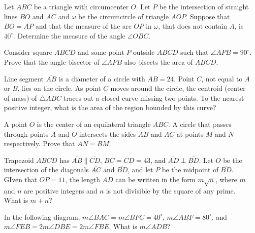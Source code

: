 \documentclass[blue,onecol]{shooting}
\begin{document}
\begin{req}[Brazil 2007]{4}
Let $ABC$ be a triangle with circumcenter $O$. Let $P$ be the intersection of straight lines $BO$ and $AC$ and $\omega$ be the circumcircle of triangle $AOP$. Suppose that $BO = AP$ and that the measure of the arc $OP$ in $\omega$, that does not contain $A$, is $40^{\circ}$. Determine the measure of the angle $\angle OBC$.
\end{req}

\begin{prob}[]{4}
Consider square $ABCD$ and some point $P$ outside $ABCD$ such that $\angle APB=90^{\circ}.$ Prove that the angle bisector of $\angle APB$ also bisects the area of $ABCD.$
\end{prob}
 
\begin{req}[AMC 10B 2018/12]{4}
Line segment $\overline{AB}$ is a diameter of a circle with $AB=24$. Point $C$, not equal to $A$ or $B$, lies on the circle. As point $C$ moves around the circle, the centroid (center of mass) of $\triangle{ABC}$ traces out a closed curve missing two points. To the nearest positive integer, what is the area of the region bounded by this curve?
\end{req}

\begin{prob}{6}
A point $O$ is the center of an equilateral triangle $ABC.$ A circle that passes through points $A$ and $O$ intersects the sides $AB$ and $AC$ at points $M$ and $N$ respectively. Prove that $AN = BM.$
\end{prob}

\begin{req}[AMC 10A 2021/17]{6}
Trapezoid $ABCD$ has $\overline{AB} \parallel \overline{CD}$, $BC = CD = 43$, and $\overline{AD} \perp \overline{BD}$. Let $O$ be the intersection of the diagonals $\overline{AC}$ and $\overline{BD}$, and let $P$ be the midpoint of $\overline{BD}$. GIven that $OP = 11$, the length $AD$ can be written in the form $m\sqrt{n}$, where $m$ and $n$ are positive integers and $n$ is not divisible by the square of any prime. What is $m + n$?
\end{req}
    
\begin{prob}{6}
In the following diagram, $m\angle BAC=m\angle BFC=40^{\circ}$, $m\angle ABF=80^{\circ}$, and $m\angle FEB=2m\angle DBE=2m\angle FBE$. What is $m\angle ADB$?
\end{prob}
    
\end{document}
